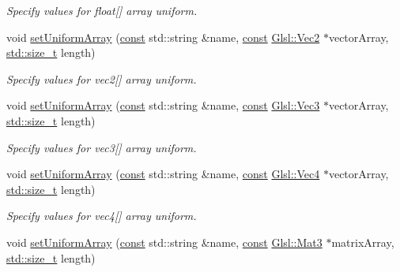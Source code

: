 \begin{DoxyCompactItemize}
\begin{DoxyCompactList}\small\item\em Specify values for {\ttfamily float}\mbox{[}\mbox{]} array uniform. \end{DoxyCompactList}\item 
void \hyperlink{classsf_1_1_shader_ab2e2eab45d9a091f3720c0879a5bb026}{set\-Uniform\-Array} (\hyperlink{term__entry_8h_a57bd63ce7f9a353488880e3de6692d5a}{const} std\-::string \&name, \hyperlink{term__entry_8h_a57bd63ce7f9a353488880e3de6692d5a}{const} \hyperlink{namespacesf_1_1_glsl_adeed356d346d87634b4c197a530e4edf}{Glsl\-::\-Vec2} $\ast$vector\-Array, \hyperlink{nc__alloc_8h_a7b60c5629e55e8ec87a4547dd4abced4}{std\-::size\-\_\-t} length)
\begin{DoxyCompactList}\small\item\em Specify values for {\ttfamily vec2}\mbox{[}\mbox{]} array uniform. \end{DoxyCompactList}\item 
void \hyperlink{classsf_1_1_shader_aeae884292fed977bbea5039818f208e7}{set\-Uniform\-Array} (\hyperlink{term__entry_8h_a57bd63ce7f9a353488880e3de6692d5a}{const} std\-::string \&name, \hyperlink{term__entry_8h_a57bd63ce7f9a353488880e3de6692d5a}{const} \hyperlink{namespacesf_1_1_glsl_a9bdd0463b7cb5316244a082007bd50f0}{Glsl\-::\-Vec3} $\ast$vector\-Array, \hyperlink{nc__alloc_8h_a7b60c5629e55e8ec87a4547dd4abced4}{std\-::size\-\_\-t} length)
\begin{DoxyCompactList}\small\item\em Specify values for {\ttfamily vec3}\mbox{[}\mbox{]} array uniform. \end{DoxyCompactList}\item 
void \hyperlink{classsf_1_1_shader_aa89ac1ea7918c9b1c2232df59affb7fa}{set\-Uniform\-Array} (\hyperlink{term__entry_8h_a57bd63ce7f9a353488880e3de6692d5a}{const} std\-::string \&name, \hyperlink{term__entry_8h_a57bd63ce7f9a353488880e3de6692d5a}{const} \hyperlink{namespacesf_1_1_glsl_a862f8df4771d2403de28653328fac5d0}{Glsl\-::\-Vec4} $\ast$vector\-Array, \hyperlink{nc__alloc_8h_a7b60c5629e55e8ec87a4547dd4abced4}{std\-::size\-\_\-t} length)
\begin{DoxyCompactList}\small\item\em Specify values for {\ttfamily vec4}\mbox{[}\mbox{]} array uniform. \end{DoxyCompactList}\item 
void \hyperlink{classsf_1_1_shader_a69587701d347ba21d506197d0fb9f842}{set\-Uniform\-Array} (\hyperlink{term__entry_8h_a57bd63ce7f9a353488880e3de6692d5a}{const} std\-::string \&name, \hyperlink{term__entry_8h_a57bd63ce7f9a353488880e3de6692d5a}{const} \hyperlink{namespacesf_1_1_glsl_a1bf4595b60b08c79473a882e2c1dbff8}{Glsl\-::\-Mat3} $\ast$matrix\-Array, \hyperlink{nc__alloc_8h_a7b60c5629e55e8ec87a4547dd4abced4}{std\-::size\-\_\-t} length)

\end{DoxyCompactItemize}
